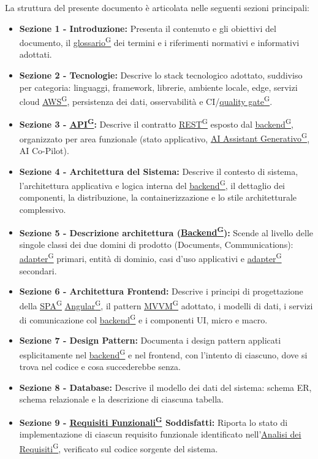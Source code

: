 \documentclass[a4paper,12pt]{article}
\providecommand{\glslink}[2]{\href{https://alittlebyte-19.github.io/Documentazione/glossario.html\#gls-#1}{\underline{#2}\textsuperscript{\scriptsize G}}}
\begin{document}
La struttura del presente documento è articolata nelle seguenti sezioni principali:
\begin{itemize}
    \item \textbf{Sezione 1 - Introduzione:} Presenta il contenuto e gli obiettivi del documento, il \glslink{glossario}{glossario} dei termini e i riferimenti normativi e informativi adottati.
    \item \textbf{Sezione 2 - Tecnologie:} Descrive lo stack tecnologico adottato, suddiviso per categoria: linguaggi, framework, librerie, ambiente locale, edge, servizi cloud \glslink{aws}{AWS}, persistenza dei dati, osservabilità e CI/\glslink{quality-gate}{quality gate}.
    \item \textbf{Sezione 3 - \glslink{api-application-programming-interface}{API}:} Descrive il contratto \glslink{rest-representational-state-transfer}{REST} esposto dal \glslink{backend}{backend}, organizzato per area funzionale (stato applicativo, \glslink{ai-assistant-generativo-ai-assistant}{AI Assistant Generativo}, AI Co-Pilot).
    \item \textbf{Sezione 4 - Architettura del Sistema:} Descrive il contesto di sistema, l'architettura applicativa e logica interna del \glslink{backend}{backend}, il dettaglio dei componenti, la distribuzione, la containerizzazione e lo stile architetturale complessivo.
    \item \textbf{Sezione 5 - Descrizione architettura (\glslink{backend}{Backend}):} Scende al livello delle singole classi dei due domini di prodotto (Documents, Communications): \glslink{adapter}{adapter} primari, entità di dominio, casi d'uso applicativi e \glslink{adapter}{adapter} secondari.
    \item \textbf{Sezione 6 - Architettura Frontend:} Descrive i principi di progettazione della \glslink{spa-single-page-application}{SPA} \glslink{angular}{Angular}, il pattern \glslink{mvvm-model-view-viewmodel}{MVVM} adottato, i modelli di dati, i servizi di comunicazione col \glslink{backend}{backend} e i componenti UI, micro e macro.
    \item \textbf{Sezione 7 - Design Pattern:} Documenta i design pattern applicati esplicitamente nel \glslink{backend}{backend} e nel frontend, con l'intento di ciascuno, dove si trova nel codice e cosa succederebbe senza.
    \item \textbf{Sezione 8 - Database:} Descrive il modello dei dati del sistema: schema ER, schema relazionale e la descrizione di ciascuna tabella.
    \item \textbf{Sezione 9 - \glslink{requisiti-funzionali}{Requisiti Funzionali} Soddisfatti:} Riporta lo stato di implementazione di ciascun requisito funzionale identificato nell'\glslink{analisi-dei-requisiti-adr}{Analisi dei Requisiti}, verificato sul codice sorgente del sistema.
\end{itemize}
\end{document}
